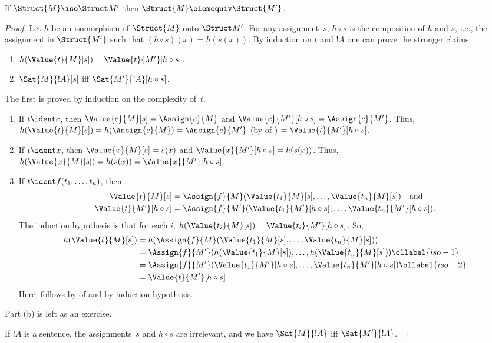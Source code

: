 \documentclass[../../../include/open-logic-section]{subfiles}
\begin{document}
\begin{thm}
If $\Struct{M} \iso \Struct M'$ then $\Struct{M} \elemequiv
\Struct{M'}$.
\end{thm}

\begin{proof}
Let $h$ be an isomorphism of $\Struct{M}$ onto $\Struct M'$. For any
assignment~$s$, $h \circ s$ is the composition of $h$ and $s$, i.e.,
the assignment in $\Struct{M'}$ such that $(h \circ s)(x) = h(s(x))$.
By induction on $t$ and $!A$ one can prove the stronger claims:
\begin{enumerate}
  \item[a.] $h(\Value{t}{M}[s]) = \Value{t}{M'}[h\circ s]$.
  \item[b.] $\Sat{M}{!A}[s]$ iff $\Sat{M'}{!A}[h \circ s]$.
\end{enumerate}
The first is proved by induction on the complexity of~$t$.
\begin{enumerate}
\item If $t \ident c$, then $\Value{c}{M}[s] = \Assign{c}{M}$ and
  $\Value{c}{M'}[h \circ s] = \Assign{c}{M'}$. Thus,
  $h(\Value{t}{M}[s]) = h(\Assign{c}{M}) = \Assign{c}{M'}$ (by
   of ) $=
  \Value{t}{M'}[h \circ s]$.
\item If $t \ident x$, then $\Value{x}{M}[s] = s(x)$ and
  $\Value{x}{M'}[h \circ s] = h(s(x))$. Thus, $h(\Value{x}{M}[s]) =
  h(s(x)) = \Value{x}{M'}[h \circ s]$.
\item If $t \ident f(t_1, \dots, t_n)$, then
  \begin{align*}
    \Value{t}{M}[s] & = \Assign{f}{M}(\Value{t_1}{M}[s], \dots, \Value{t_n}{M}[s]) \quad\text{and}\\
  \Value{t}{M'}[h \circ s] & = \Assign{f}{M'}(\Value{t_1}{M'}[h \circ
    s], \dots, \Value{t_n}{M'}[h \circ s]).
  \end{align*}
  The induction hypothesis is that for each $i$, $h(\Value{t_i}{M}[s])
  = \Value{t_i}{M'}[h\circ s]$. So,
  \begin{align}
    h(\Value{t}{M}[s]) 
    & = h(\Assign{f}{M}(\Value{t_1}{M}[s], \dots, \Value{t_n}{M}[s]))\notag\\
    & = \Assign{f}{M'}(h(\Value{t_1}{M}[s]), \dots,
    h(\Value{t_n}{M}[s])) \ollabel{iso-1}\\
    & = \Assign{f}{M'}(\Value{t_1}{M'}[h \circ s], \dots,
    \Value{t_n}{M'}[h \circ s]) \ollabel{iso-2}\\
    & = \Value{t}{M'}[h\circ s] \notag
  \end{align}
  Here,  follows by  of
   and  by induction hypothesis.
\end{enumerate}
Part (b) is left as an exercise.

If $!A$ is a sentence, the assignments~$s$ and $h \circ s$ are
irrelevant, and we have $\Sat{M}{!A}$ iff $\Sat{M'}{!A}$.
\end{proof}
\end{document}
